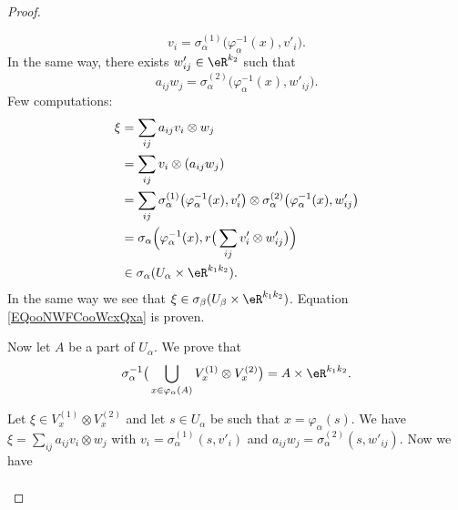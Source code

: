 \begin{proof}
\begin{subproof}
\begin{subproof}
			\begin{equation}
				v_i=\sigma_{\alpha}^{(1)}\big( \varphi_{\alpha}^{-1}(x),v'_i \big).
			\end{equation}
			In the same way, there exists \( w'_{ij}\in \eR^{k_2}\) such that
			\begin{equation}
				a_{ij}w_j=\sigma_{\alpha}^{(2)}\big( \varphi_{\alpha}^{-1}(x),w'_{ij} \big).
			\end{equation}
			Few computations:
			\begin{subequations}
				\begin{align}
					\xi & =\sum_{ij}a_{ij}v_i\otimes w_j                                                                                                                     \\
					    & =\sum_{ij}v_i\otimes (a_{ij}w_j)                                                                                                                   \\
					    & =\sum_{ij}\sigma_{\alpha}^{(1)}\big( \varphi_{\alpha}^{-1}(x),v'_i \big)\otimes \sigma_{\alpha}^{(2)}\big( \varphi_{\alpha}^{-1}(x), w'_{ij} \big) \\
					    & =\sigma_{\alpha}\Big( \varphi_{\alpha}^{-1}(x),r\big( \sum_{ij}v'_i\otimes w'_{ij} \big) \Big)                                                     \\
					    & \in \sigma_{\alpha}(U_{\alpha}\times \eR^{k_1k_2}).
				\end{align}
			\end{subequations}
			In the same way we see that \( \xi\in \sigma_{\beta}(U_{\beta}\times \eR^{k_1k_2})\). Equation \eqref{EQooNWFCooWcxQxa} is proven.
		\end{subproof}
		Now let \( A\) be a part of \( U_{\alpha}\). We prove that
		\begin{equation}		\label{EQooJCUAooYxMMvC}
			\sigma_{\alpha}^{-1}\big( \bigcup_{x\in \varphi_{\alpha}(A)}V_x^{(1)}\otimes V_x^{(2)} \big)=A\times \eR^{k_1k_2}.
		\end{equation}
		\begin{subproof}
			Let \( \xi\in V_x^{(1)}\otimes V_x^{(2)}\) and let \( s\in U_{\alpha}\) be such that \( x=\varphi_{\alpha}(s)\). We have \( \xi=\sum_{ij}a_{ij} v_i\otimes w_j\) with \( v_i= \sigma_{\alpha}^{(1)}(s,v'_i)\) and \( a_{ij}w_j=\sigma_{\alpha}^{(2)}(s,w'_{ij})\). Now we have
			\begin{subequations}
				\begin{align}

\end{align}
\end{subequations}
\end{subproof}
\end{subproof}
\end{proof}
